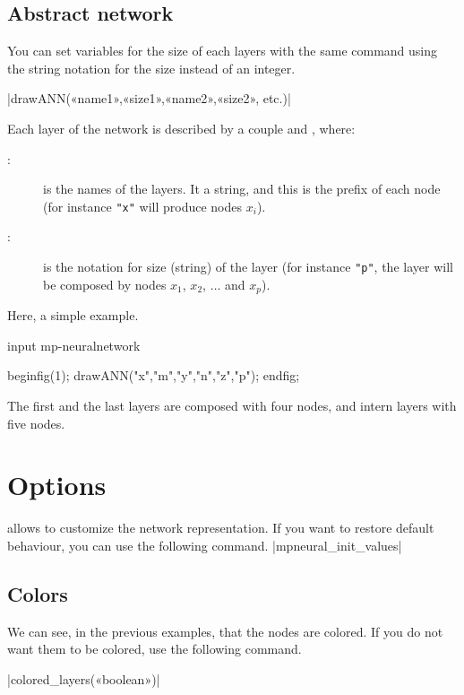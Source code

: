 \documentclass[english]{ltxdoc}
\begin{document}
\subsection{Abstract network}

You can set variables for the size of each layers with the same command using
the string notation for the size instead of an integer. 

\commande|drawANN(«name1»,«size1»,«name2»,«size2», etc.)|\smallskip{}

Each layer of the network  is described by a couple  and , where:
\begin{description}
  \item[:] is the names of the layers. It a
  string, and this is the prefix of each node (for instance \lstinline+"x"+ will
  produce nodes $x_i$).
  \item[:] is the notation for size (string)  of the layer (for instance
  \lstinline+"p"+, the layer will be composed by nodes $x_1$, $x_2$, $\dots$ and $x_p$).
\end{description}
Here, a simple example.
\begin{ExempleMP}
input mp-neuralnetwork

beginfig(1);
drawANN("x","m","y","n","z","p");
endfig;
\end{ExempleMP}

The first and the last layers are composed with four nodes, and intern layers
with five nodes. 

\section{Options}

\mpneural allows to customize the network representation. If you want to restore
default behaviour, you can use the following command.
\commande|mpneural_init_values|\smallskip{}


\subsection{Colors}

We can see, in the previous examples, that the nodes are colored. If you do not
want them to be colored, use the following command. 

\commande|colored_layers(«boolean»)|\smallskip{}
\end{document}
